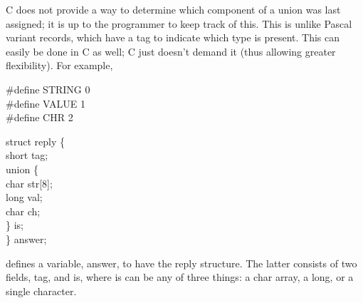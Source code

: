      C does  not provide  a way  to determine which component  of a union
was last assigned; it  is up  to the  programmer to  keep track of
this. This
is unlike Pascal variant records,  which have a tag to indicate which
type is present. This can easily be  done in  C as well; C just
doesn't demand it (thus allowing greater flexibility). For example,
\begin{code}
  \#define STRING 0 \\
  \#define VALUE  1 \\
  \#define CHR    2 \addVspace

  struct reply \{			\+\\
       short tag;			\\
       union \{ 				\+\\
            char str[8]; 	\\
            long val; 		\\
            char ch;			\-\\
       \} is;				\-\\
  \} answer;
\end{code}
\noindent
defines a variable, {\cd answer}, to have the {\cd reply} structure.
The latter consists of two fields, {\cd tag}, and {\cd is}, where
{\cd is} can be any of three things: a {\cd char} array, a {\cd
long}, or a single character.

